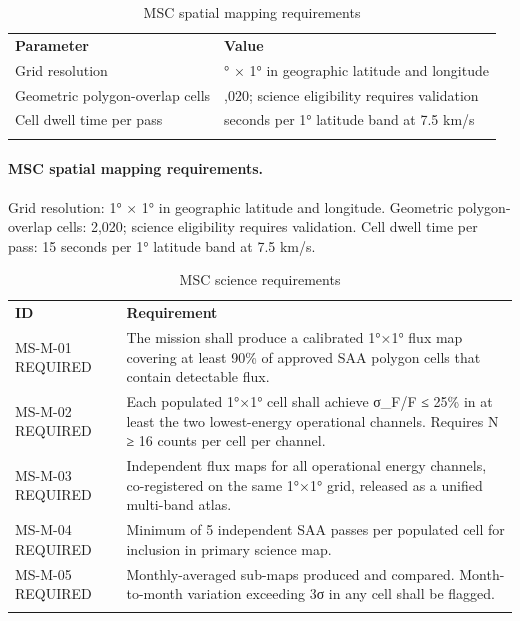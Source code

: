 \ifrequirementsedition
\begin{longtable}{@{}
  >{\raggedright\arraybackslash}p{}
  >{\raggedright\arraybackslash}p{}@{}}
\caption{MSC spatial mapping requirements}\label{tab:01-mission-context-5}\\
\toprule\noalign{}
\textbf{Parameter} & \textbf{Value} \\
Grid resolution & 1° × 1° in geographic latitude and longitude \\
Geometric polygon-overlap cells & 2,020; science eligibility requires validation \\
Cell dwell time per pass & 15 seconds per 1° latitude band at 7.5 km/s \\
\midrule\noalign{}
\endhead
\bottomrule\noalign{}
\endlastfoot
\end{longtable}
\else
\paragraph{MSC spatial mapping requirements.} Grid resolution: 1° × 1° in geographic latitude and longitude. Geometric polygon-overlap cells: 2,020; science eligibility requires validation. Cell dwell time per pass: 15 seconds per 1° latitude band at 7.5 km/s.
\fi

\ifrequirementsedition
\begin{longtable}{@{}
  >{\raggedright\arraybackslash}p{}
  >{\raggedright\arraybackslash}p{}@{}}
\caption{MSC science requirements}\label{tab:01-mission-context-6}\\
\toprule\noalign{}
\textbf{ID} & \textbf{Requirement} \\
MS-M-01 REQUIRED & The mission shall produce a calibrated 1°×1° flux map covering at least
90\% of approved SAA polygon cells that contain detectable flux. \\
MS-M-02 REQUIRED & Each populated 1°×1° cell shall achieve σ\_F/F ≤ 25\% in at least the
two lowest-energy operational channels. Requires N ≥ 16 counts per cell
per channel. \\
MS-M-03 REQUIRED & Independent flux maps for all operational energy channels, co-registered
on the same 1°×1° grid, released as a unified multi-band atlas. \\
MS-M-04 REQUIRED & Minimum of 5 independent SAA passes per populated cell for inclusion in
primary science map. \\
MS-M-05 REQUIRED & Monthly-averaged sub-maps produced and compared. Month-to-month
variation exceeding 3σ in any cell shall be flagged. \\
\midrule\noalign{}
\endhead
\bottomrule\noalign{}
\endlastfoot
\end{longtable}
\else
